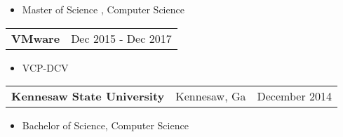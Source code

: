\documentclass{book}
\newenvironment{myitemize}
{ \begin{itemize}
	\setlength{\itemsep}{0pt}
	\setlength{\parskip}{0pt}
	\setlength{\parsep}{0pt}     }
{ \end{itemize}                  }
\begin{document}
\begin{myitemize}

	\item Master of Science , Computer Science 

\end{myitemize}

\begin{tabular}{L{4.75in}R{1.75in}}

	{\large {\bfseries VMware}} & Dec 2015 - Dec 2017 \\

\end{tabular}

	\begin{myitemize}
		\item VCP-DCV
	\end{myitemize} 

\begin{tabular}{L{3in}L{1.75in}R{1.75in}}

	{\large {\bfseries Kennesaw State University}} & Kennesaw, Ga & December 2014 \\%

\end{tabular}

\begin{myitemize}

	\item Bachelor of Science, Computer Science 

\end{myitemize}
\end{document}
